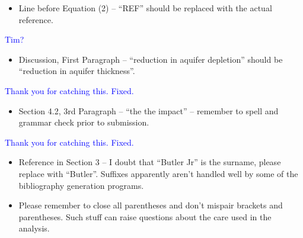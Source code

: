 \documentclass[
]{article}
\providecommand{\tightlist}{%
  \setlength{\itemsep}{0pt}\setlength{\parskip}{0pt}}
\begin{document}
\begin{itemize}
\tightlist
\item
  Line before Equation (2) -- ``REF'' should be replaced with the actual
  reference.
\end{itemize}

\textcolor{blue}{Tim?}

\begin{itemize}
\tightlist
\item
  Discussion, First Paragraph -- ``reduction in aquifer depletion''
  should be ``reduction in aquifer thickness''.
\end{itemize}

\textcolor{blue}{Thank you for catching this. Fixed.}

\begin{itemize}
\tightlist
\item
  Section 4.2, 3rd Paragraph -- ``the the impact'' -- remember to spell
  and grammar check prior to submission.
\end{itemize}

\textcolor{blue}{Thank you for catching this. Fixed.}

\begin{itemize}
\tightlist
\item
  Reference in Section 3 -- I doubt that ``Butler Jr'' is the surname,
  please replace with ``Butler''. Suffixes apparently aren't handled
  well by some of the bibliography generation programs.
\end{itemize}

\textcolor{blue}{}

\begin{itemize}
\tightlist
\item
  Please remember to close all parentheses and don't mispair brackets
  and parentheses. Such stuff can raise questions about the care used in
  the analysis.
\end{itemize}
\end{document}
